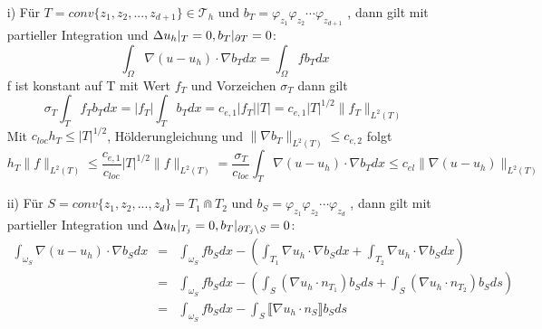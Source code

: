\begin{itemize}
	\item[i)] 
	Für $T =conv\{z_1,z_2,...,z_{d+1}\} \in\mathscr{T}_h$ und $b_T = \varphi_{z_1}\varphi_{z_2}\cdots\varphi_{z_{d+1}}$ , dann gilt mit partieller Integration und $\Delta u_h|_T = 0, b_T|_{\partial T} = 0$:
	\[
	\int_{\Omega} \nabla (u - u_h) \cdot \nabla b_Tdx =\int_{\Omega} f b_T dx
	\]
    f ist konstant auf T mit Wert $f_T$ und Vorzeichen $\sigma_T$ dann gilt
    \[
    \sigma_T\int_{T}f_Tb_Tdx=|f_T|\int_{T}b_Tdx=c_{e,1}|f_T||T|= c_{e,1}|T|^{1/2}\|f_T\|_{L^2(T)}
    \]
    Mit $c_{loc}h_T \leq |T|^{1/2}$, Hölderungleichung und $\|\nabla b_T\|_{L^2(T)} \leq c_{e,2}$ folgt
    \[
    h_T\|f\|_{L^2(T)}\leq \frac{c_{e,1}}{c_{loc}} |T|^{1/2}\|f\|_{L^2(T)} =\frac{\sigma_T}{c_{loc}}\int_{T}\nabla (u - u_h) \cdot \nabla b_Tdx \leq c_{el} \|\nabla (u-u_h)\|_{L^2(T)}
    \]
    \item[ii)]
    Für $S =conv\{z_1,z_2,...,z_{d}\} = T_1 \Cap T_2$ und $b_S = \varphi_{z_1}\varphi_{z_2}\cdots\varphi_{z_{d}}$ , dann gilt mit partieller Integration und $\Delta u_h|_{T_j} = 0, b_T|_{\partial T_j\setminus S} = 0$:
    \begin{eqnarray*}
    	\int_{\omega_S} \nabla (u-u_h)\cdot \nabla b_S dx &=& \int_{\omega_S} fb_Sdx -\left(\int_{T_1} \nabla u_h\cdot \nabla b_S dx + \int_{T_2} \nabla u_h\cdot \nabla b_S dx\right) \\
    	&=& \int_{\omega_S} fb_Sdx - \left(\int_{S} (\nabla u_h\cdot n_{T_1}) b_S ds + \int_{S} (\nabla u_h\cdot n_{T_2}) b_S ds\right)\\
    	&=& \int_{\omega_S} fb_Sdx - \int_{S} \llbracket \nabla u_h \cdot n_S\rrbracket b_S ds
    \end{eqnarray*}
	
\end{itemize}